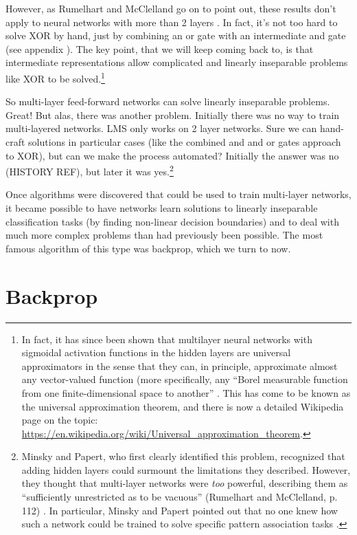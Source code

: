 However, as Rumelhart and McClelland go on to point out, these results don't apply to neural networks with more than 2 layers \cite{rumelhart1986parallel}. In fact, it's not too hard to solve XOR by hand, just by combining an or gate with an intermediate and gate (see appendix ). The key point, that we will keep coming back to, is that intermediate representations allow complicated and linearly inseparable problems like XOR to be solved.\footnote{In fact, it has since been shown that multilayer neural networks with sigmoidal activation functions in the hidden layers are universal approximators in the sense that they can, in principle, approximate almost any vector-valued function (more specifically, any ``Borel measurable function from one finite-dimensional space to another'' \cite{hornik1989multilayer}. This has come to be known as the universal approximation theorem, and there is now a detailed Wikipedia page on the topic: \url{https://en.wikipedia.org/wiki/Universal_approximation_theorem}.}

So multi-layer feed-forward networks can solve linearly inseparable problems. Great!  But alas, there was another problem. Initially there was no way to train multi-layered networks. LMS only works on 2 layer networks. Sure we can hand-craft solutions in particular cases (like the combined and and or gates approach to XOR), but can we make the process automated? Initially the answer was no (HISTORY REF), but later it was yes.\footnote{Minsky and Papert, who first clearly identified this problem, recognized that adding hidden layers could surmount the limitations they described. However, they thought that multi-layer networks were {\em too} powerful, describing them as ``sufficiently unrestricted as to be vacuous'' (Rumelhart and McClelland, p. 112) \cite{rumelhart1986parallel}. In particular, Minsky and Papert pointed out that no one knew how such a network could be trained to solve specific pattern association tasks \cite{minsky1969perceptrons}.}

Once algorithms were discovered that could be used to train multi-layer networks, it became possible to have networks learn solutions to linearly inseparable classification tasks (by finding non-linear decision boundaries) and to deal with much more complex problems than had previously been possible. The most famous algorithm of this type was backprop, which we turn to now.

\section{Backprop}\label{backprop}

